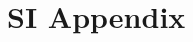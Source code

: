 \documentclass{article}
\theoremstyle{definition}
\theoremstyle{remark}
\begin{document}
\clearpage
\setcounter{figure}{0}
\setcounter{table}{0}
\renewcommand{\thefigure}{S\arabic{figure}}
\renewcommand{\thetable}{S\arabic{table}}
\setcounter{section}{0}
\renewcommand{\thesection}{S\arabic{section}}

\section*{SI Appendix}

\end{document}
